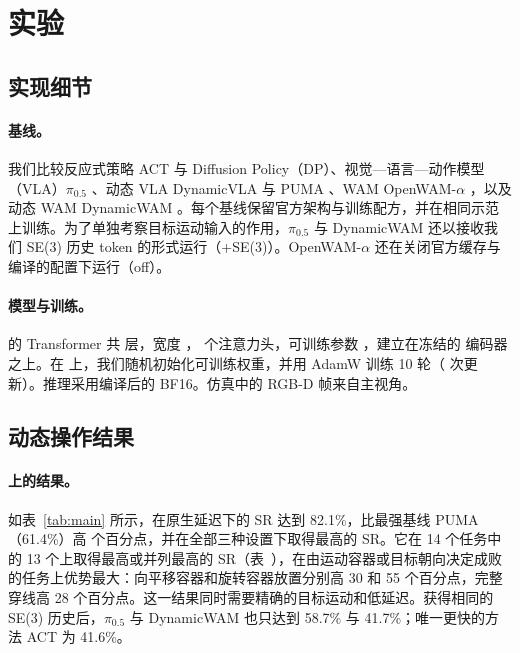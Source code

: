 \section{实验}
\label{sec:experiments}

\subsection{实现细节}
\label{sec:setup}

\paragraph{基线。}
我们比较反应式策略 ACT \cite{act} 与 Diffusion Policy（DP）\cite{diffusionpolicy}、视觉—语言—动作模型（VLA）$\pi_{0.5}$ \cite{pi05}、动态 VLA DynamicVLA \cite{dynamicvla} 与 PUMA \cite{domino}、WAM OpenWAM-$\alpha$ \cite{openwam_alpha}，以及动态 WAM DynamicWAM \cite{dynamicwam}。每个基线保留官方架构与训练配方，并在相同示范上训练。为了单独考察目标运动输入的作用，$\pi_{0.5}$ 与 DynamicWAM 还以接收我们 SE(3) 历史 token 的形式运行（+SE(3)）。OpenWAM-$\alpha$ 还在关闭官方缓存与编译的配置下运行（off）。

\paragraph{模型与训练。}
\ours 的 Transformer 共 \cfgLayers{} 层，宽度 \cfgWidth{}，\cfgHeads{} 个注意力头，可训练参数 \cfgTrainableParams{}，建立在冻结的 \cfgVisualEncoder{} 编码器之上。在 \bench 上，我们随机初始化可训练权重，并用 AdamW 训练 10 轮（\cfgUpdates{} 次更新）。推理采用编译后的 BF16。仿真中的 RGB-D 帧来自主视角。



\subsection{动态操作结果}
\label{sec:main_results}

\paragraph{\bench 上的结果。}
如表~\ref{tab:main} 所示，\ours 在原生延迟下的 SR 达到 82.1\%，比最强基线 PUMA（61.4\%）高 \nativeLead{} 个百分点，并在全部三种设置下取得最高的 SR。它在 14 个任务中的 13 个上取得最高或并列最高的 SR（表~），在由运动容器或目标朝向决定成败的任务上优势最大：向平移容器和旋转容器放置分别高 30 和 55 个百分点，完整穿线高 28 个百分点。这一结果同时需要精确的目标运动和低延迟。获得相同的 SE(3) 历史后，$\pi_{0.5}$ 与 DynamicWAM 也只达到 58.7\% 与 41.7\%；唯一更快的方法 ACT 为 41.6\%。

